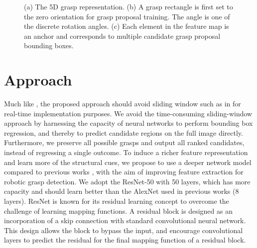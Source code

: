 \documentclass[letterpaper, 10 pt, journal, twoside]{IEEEtran}
\begin{document}
\begin{figure}
  \vspace*{0.07in}
  \hspace*{-0.02in}
  \centering
  \vspace*{-1.0ex}
  \caption{
    (a) The 5D grasp representation. 
(b) A grasp rectangle is first set to the zero orientation for grasp 
    proposal training. The angle  is one of the discrete rotation
    angles. 
    (c) Each element in the feature map is an anchor and corresponds
    to multiple candidate grasp proposal bounding boxes.
    \label{fig_rectangle}}
  \vspace*{-1.0ex}
\end{figure}

 
\section{Approach}



Much like \cite{redmon2015real,GuEtAl_ICRA2017}, the proposed approach
should avoid sliding window such as in \cite{lenz2015deep} for real-time
implementation purposes. We avoid the time-consuming sliding-window
approach by harnessing the capacity of neural networks to perform
bounding box regression, and thereby to predict candidate regions on the
full image directly.  Furthermore, we preserve all possible grasps and
output all ranked candidates, instead of regressing a single outcome.
To induce a richer feature representation and learn more of the
structural cues, we propose to use a deeper network model compared to
previous works \cite{redmon2015real, lenz2015deep, pinto2016supersizing},
with the aim of improving feature extraction for robotic grasp detection. 
We adopt the ResNet-50 \cite{he2016deep} with 50 layers, which has more
capacity and should learn better than the AlexNet
\cite{krizhevsky2012imagenet} used in previous works (8 layers). 
ResNet is known for its residual learning concept to overcome the challenge
of learning mapping functions. A residual block is designed as an incorporation
of a skip connection with standard convolutional neural network. This design
allows the block to bypass the input, and encourage convolutional layers to
predict the residual for the final mapping function of a residual block. 
\end{document}
